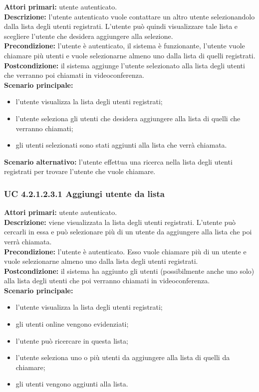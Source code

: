 \noindent
\textbf{Attori primari:} utente autenticato.\\
\textbf{Descrizione:} l'utente autenticato vuole contattare un altro utente selezionandolo dalla lista degli utenti registrati. L'utente può quindi visualizzare tale lista e scegliere l'utente che desidera aggiungere alla selezione.\\
\textbf{Precondizione:} l'utente è autenticato, il sistema è funzionante, l'utente vuole chiamare più utenti e vuole selezionarne almeno uno dalla lista di quelli registrati.\\
\textbf{Postcondizione:} il sistema aggiunge l'utente selezionato alla lista degli utenti che verranno poi chiamati in videoconferenza.\\
\textbf{Scenario principale:}
\begin{itemize}
\item l'utente visualizza la lista degli utenti registrati;
\item l'utente seleziona gli utenti che desidera aggiungere alla lista di quelli che verranno chiamati;
\item gli utenti selezionati sono stati aggiunti alla lista che verrà chiamata.
\end{itemize}
\textbf{Scenario alternativo:} l'utente effettua una ricerca nella lista degli utenti registrati per trovare l'utente che vuole chiamare.

\subsubsection{UC 4.2.1.2.3.1 Aggiungi utente da lista}
\noindent
\textbf{Attori primari:} utente autenticato.\\
\textbf{Descrizione:} viene visualizzata la lista degli utenti registrati. L'utente può cercarli in essa e può selezionare più di un utente da aggiungere alla lista che poi verrà chiamata.\\
\textbf{Precondizione:} l'utente è autenticato. Esso vuole chiamare più di un utente e vuole selezionarne almeno uno dalla lista degli utenti registrati.\\
\textbf{Postcondizione:} il sistema ha aggiunto gli utenti (possibilmente anche uno solo) alla lista degli utenti che poi verranno chiamati in videoconferenza.\\
\textbf{Scenario principale:}
\begin{itemize}
\item l'utente visualizza la lista degli utenti registrati;
\item gli utenti online vengono evidenziati;
\item l'utente può ricercare in questa lista;
\item l'utente seleziona uno o più utenti da aggiungere alla lista di quelli da chiamare;
\item gli utenti vengono aggiunti alla lista.
\end{itemize}

